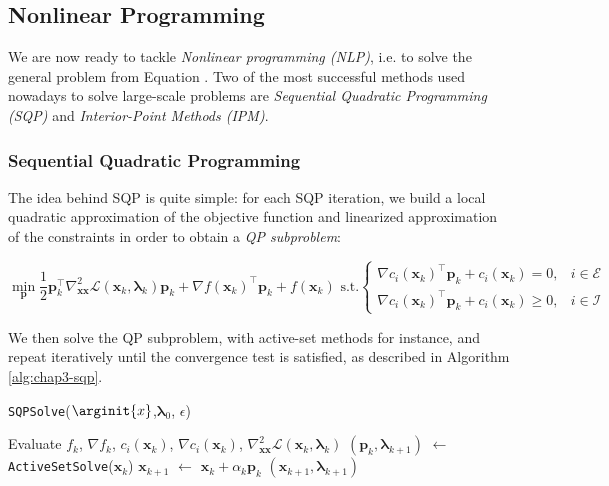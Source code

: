 \subsection{Nonlinear Programming}

We are now ready to tackle \emph{Nonlinear programming (NLP)}, i.e. to
solve the general problem from Equation . Two of the
most successful methods used nowadays to solve large-scale problems
are \emph{Sequential Quadratic Programming (SQP)} and
\emph{Interior-Point Methods (IPM)}.

\subsubsection{Sequential Quadratic Programming}
\label{subsubsec:chap3-sqp}

The idea behind SQP is quite simple: for each SQP iteration, we build
a local quadratic approximation of the objective function and
linearized approximation of the constraints in order to obtain a
\emph{QP subproblem}:

\begin{equation}
\label{eq:chap3-sqp}
\min_{\mathbf{p}}\frac{1}{2}\mathbf{p}_k^{\top}\nabla_{\mathbf{x}\mathbf{x}}^2\mathcal{L}(\mathbf{x}_k,\boldsymbol{\lambda}_k)\mathbf{p}_k+\nabla f(\mathbf{x}_k)^{\top}\mathbf{p}_k+f(\mathbf{x}_k)
\text{ s.t.}
\left\{\begin{array}{cc}
\nabla c_i(\mathbf{x}_k)^{\top}\mathbf{p}_k+c_i(\mathbf{x}_k) = 0, & i \in \mathcal{E} \\
\nabla c_i(\mathbf{x}_k)^{\top}\mathbf{p}_k+c_i(\mathbf{x}_k) \ge 0, & i \in \mathcal{I}
\end{array}\right.
\end{equation}

We then solve the QP subproblem, with active-set methods for instance,
and repeat iteratively until the convergence test is satisfied, as
described in Algorithm \ref{alg:chap3-sqp}.

\begin{algorithm}
\caption{\texttt{SQPSolve}($\arginit{x}$,$\boldsymbol{\lambda}_0$, $\epsilon$)}
\label{alg:chap3-sqp}
\begin{algorithmic}
\STATE Evaluate $f_k$, $\nabla f_k$, $c_i(\mathbf{x}_k)$, $\nabla c_i(\mathbf{x}_k)$, $\nabla_{\mathbf{x}\mathbf{x}}^2\mathcal{L}(\mathbf{x}_k,\boldsymbol{\lambda}_k)$
\STATE $(\mathbf{p}_k, \boldsymbol{\lambda}_{k+1})$ $\leftarrow$ \texttt{ActiveSetSolve}($\mathbf{x}_k$)
\STATE $\mathbf{x}_{k+1}$ $\leftarrow$ $\mathbf{x}_k + \alpha_k\mathbf{p}_k$
\RETURN $(\mathbf{x}_{k+1},\boldsymbol{\lambda}_{k+1})$
\ENDIF
\ENDFOR
\end{algorithmic}
\end{algorithm}

